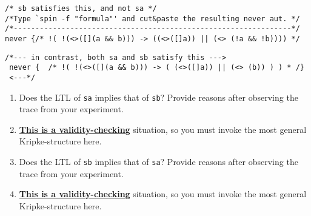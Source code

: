 \documentclass[11pt]{article}
\begin{document}
\begin{enumerate}
\begin{enumerate}


 

\begin{verbatim}
/* sb satisfies this, and not sa */
/*Type `spin -f "formula"' and cut&paste the resulting never aut. */
/*----------------------------------------------------------------*/
never {/* !( !(<>([](a && b))) -> ((<>([]a)) || (<> (!a && !b)))) */
\end{verbatim}






\begin{verbatim}
/*--- in contrast, both sa and sb satisfy this --->
 never {  /* !( !(<>([](a && b))) -> ( (<>([]a)) || (<> (b)) ) ) * /}
 <---*/
\end{verbatim}

    
    \begin{enumerate}
    \item    Does the LTL of {\tt sa} implies that of {\tt sb}?
      Provide reasons after observing the trace from your experiment.
    \item[] \underline{\bf This is a validity-checking} situation, so
      you must invoke the most general Kripke-structure here.


      
    \item    Does the LTL of {\tt sb} implies that of {\tt sa}?
      Provide reasons after observing the trace from your experiment.
    \item[] \underline{\bf This is a validity-checking} situation, so
      you must invoke the most general Kripke-structure here.
   

\end{enumerate}
\end{enumerate}
\end{enumerate}
\end{document}
